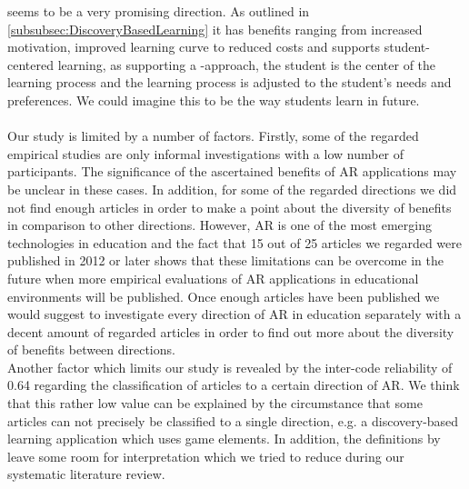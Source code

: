 \DBL seems to be a very promising \AR direction. As outlined in \ref{subsubsec:DiscoveryBasedLearning} it has benefits ranging from increased motivation, improved learning curve to reduced costs and supports student-centered learning, as supporting a \DBLns-approach, the student is the center of the learning process and the learning process is adjusted to the student's needs and preferences. We could imagine this to be the way students learn in future. \\
\\
Our study is limited by a number of factors. Firstly, some of the regarded empirical studies are only informal investigations with a low number of participants. The significance of the ascertained benefits of AR applications may be unclear in these cases. In addition, for some of the regarded directions we did not find enough articles in order to make a point about the diversity of benefits in comparison to other directions. However, AR is one of the most emerging technologies in education and the fact that 15 out of 25 articles we regarded were published in 2012 or later shows that these limitations can be overcome in the future when more empirical evaluations of AR applications in educational environments will be published. Once enough articles have been published we would suggest to investigate every direction of AR in education separately with a decent amount of regarded articles in order to find out more about the diversity of benefits between directions. \\
Another factor which limits our study is revealed by the inter-code reliability of 0.64 regarding the classification of articles to a certain direction of AR. We think that this rather low value can be explained by the circumstance that some articles can not precisely be classified to a single direction, e.g. a discovery-based learning application which uses game elements. In addition, the definitions by \cite{Yuen.2011} leave some room for interpretation which we tried to reduce during our systematic literature review.

